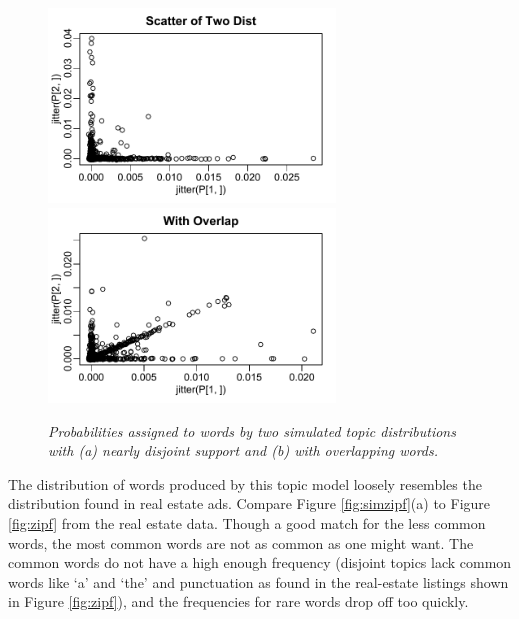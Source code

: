 \documentclass[10pt]{article}
\begin{document}
 
\begin{figure}
 \caption{ \label{fig:simdist}
  \sl Probabilities assigned to words by two simulated topic distributions with (a) nearly disjoint support and (b) with overlapping words.}  
  \centerline{   
     \includegraphics[width=3in]{figures/simdist}    
     \includegraphics[width=3in]{figures/simdistB}    }
\end{figure}


The distribution of words produced by this topic model  loosely resembles the distribution found in real estate ads.  Compare Figure \ref{fig:simzipf}(a) to Figure \ref{fig:zipf} from the real estate data.  Though a good match for the less common words, the most common words are not as common as one might want.  The common words do not have a high enough frequency (disjoint topics lack common words like `a' and `the' and punctuation as found in the real-estate listings shown in Figure \ref{fig:zipf}), and the frequencies for rare words drop off too quickly.  
\end{document}
